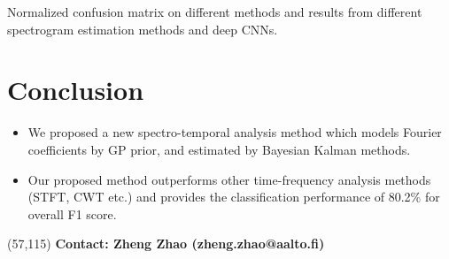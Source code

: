 \documentclass[portrait,a0,final]{a0poster} %
\newcommand{\sectionspace}{10mm} %
\begin{document}
\begin{minipage}{0.98\linewidth}
\begin{minipage}[t]{0.47\linewidth}
\vspace{5mm}
\large\centering
Normalized confusion matrix on different methods and results from different spectrogram estimation methods and deep CNNs.

\vspace{\sectionspace}
\section*{Conclusion}
\Large
\setlength{\parindent}{10mm}
\begin{itemize}
	\item We proposed a new spectro-temporal analysis method which models Fourier coefficients by GP prior, and estimated by Bayesian Kalman methods.
	\item Our proposed method outperforms other time-frequency analysis methods (STFT, CWT etc.) and provides the classification performance of 80.2\% for overall F1 score. 
\end{itemize}

\begin{textblock}{24}(57,115)
	\large \textbf{Contact: Zheng Zhao (zheng.zhao@aalto.fi)}
\end{textblock}

{\footnotesize %




} %

\end{minipage}
\end{minipage} %







%
%
%
%
%
%
%
%
%
%




\end{document}
